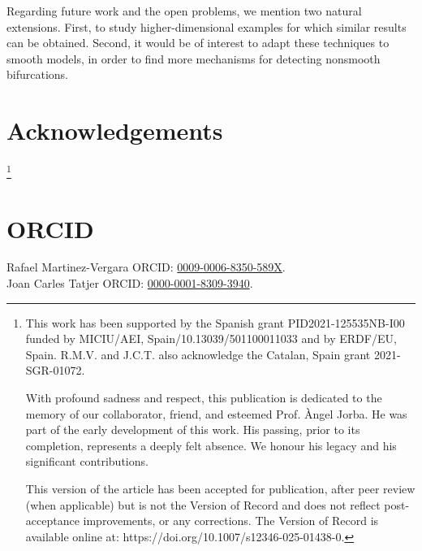 \documentclass[12pt]{article}
\theoremstyle{plain}
\theoremstyle{remark}
\theoremstyle{definition}
\begin{document}
Regarding future work and the open problems, we mention two natural extensions. First, to study higher-dimensional examples for which similar results can be obtained. Second, it would be of interest to adapt these techniques to smooth models, in order to find more mechanisms for detecting nonsmooth bifurcations.




\section*{Acknowledgements}
\thanks{
This work has been supported by the Spanish grant PID2021-125535NB-I00 funded by MICIU/AEI, Spain/10.13039/501100011033 and by ERDF/EU, Spain. 
R.M.V. and J.C.T. also acknowledge the Catalan, Spain grant 2021-SGR-01072.
\vspace{0.25cm}

With profound sadness and respect, this publication is dedicated to the memory of our collaborator, friend, and esteemed Prof. Àngel Jorba. He was part of the early development of this work. His passing, prior to its completion, represents a deeply felt absence. We honour his legacy and his significant contributions.
\vspace{0.25cm}

This version of the article has been accepted for publication, after peer review (when applicable) but is not the Version of Record and does not reflect post-acceptance improvements, or any corrections. The Version of Record is available online at: https://doi.org/10.1007/s12346-025-01438-0.
}

\section*{ORCID}
Rafael Martinez-Vergara ORCID: \href{https://orcid.org/0009-0006-8350-589X}{0009-0006-8350-589X}.\\
Joan Carles Tatjer ORCID: \href{https://orcid.org/0000-0001-8309-3940}{0000-0001-8309-3940}.



\end{document}
